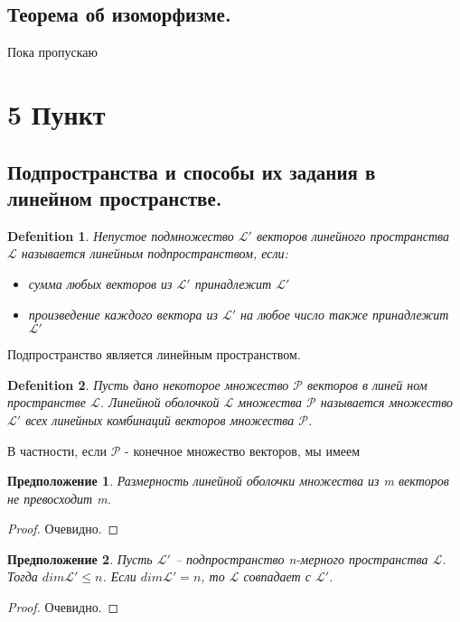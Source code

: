 \documentclass[11pt; a4paper]{report}
\theoremstyle{plain} %
\newtheorem{sug}{Предположение}[section]
\theoremstyle{defenition}
\newtheorem{glob_def}{Defenition}
\theoremstyle{remark}
\begin{document}
\subsection{Теорема об изоморфизме.}
Пока пропускаю




\newpage
\section{\Large 5 Пункт}
\subsection{Подпространства и способы их задания в линейном пространстве. }
\begin{glob_def}
Непустое подмножество $\mathscr{L'}$ векторов линейного пространства $\mathscr{L}$ называется линейным подпространством, если:
    \begin{itemize}
    \item сумма любых векторов из $\mathscr{L'}$ принадлежит $\mathscr{L'}$
    \item произведение каждого вектора из  $\mathscr{L'}$ на любое число также принадлежит  $\mathscr{L'}$
    \end{itemize}
\end{glob_def}
Подпространство является линейным про­странством.

\begin{glob_def}
Пусть дано некоторое множество $\mathscr{P}$ векторов в линей­ ном пространстве $\mathscr{L}$. Линейной оболочкой $\mathscr{L}$ множества $\mathscr{P}$ называется множество $\mathscr{L'}$ всех линейных комбинаций векторов множества $\mathscr{P}$. 
\end{glob_def}

В частности, если $\mathscr{P}$ - конечное множество векторов, мы имеем
\begin{sug}\label{sug6.2.1}
Размерность линейной оболочки множества из m векторов не превосходит m.
\end{sug}
\begin{proof}
Очевидно. 
\end{proof}

\begin{sug}\label{sug6.2.2}
Пусть $\mathscr{L'}$ -- подпространство n-мерного пространства $\mathscr{L}$. Тогда $dim\mathscr{L'} \leq n$. Если $dim\mathscr{L'}=n$, то $\mathscr{L}$ сов­падает с $\mathscr{L'}$.
\end{sug}
\begin{proof} Очевидно. \end{proof}
\end{document}
